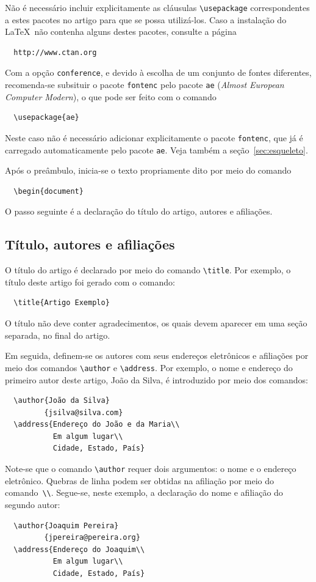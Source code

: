 \documentclass[conference,harvard,brazil,english]{sbatex}
\begin{document}
Não é necessário incluir explicitamente as cláusulas
\verb+\usepackage+ correspondentes a estes pacotes no artigo para que
se possa utilizá-los. Caso a instalação do \LaTeX\ não contenha alguns
destes pacotes, consulte a página
\begin{verbatim}
  http://www.ctan.org
\end{verbatim}



Com a opção \verb+conference+, e devido à escolha de um conjunto de
fontes diferentes, recomenda-se subsituir o pacote \verb+fontenc+ pelo
pacote \verb+ae+ (\emph{Almost European Computer Modern}), o que pode
ser feito com o comando
\begin{verbatim}
  \usepackage{ae}
\end{verbatim}
Neste caso não é necessário adicionar explicitamente o pacote
\verb+fontenc+, que já é carregado automaticamente pelo pacote
\verb+ae+. Veja também a seção~\ref{sec:esqueleto}.

Após o preâmbulo, inicia-se o texto propriamente dito por meio do
comando
\begin{verbatim}
  \begin{document}
\end{verbatim}
O passo seguinte é a declaração do título do artigo, autores e
afiliações.

\subsection{Título, autores e afiliações}

O título do artigo é declarado por meio do comando \verb+\title+. Por
exemplo, o título deste artigo foi gerado com o comando:
\begin{verbatim}
  \title{Artigo Exemplo}
\end{verbatim}
O título não deve conter agradecimentos, os quais devem aparecer em
uma seção separada, no final do artigo.

Em seguida, definem-se os autores com seus endereços eletrônicos e
afiliações por meio dos comandos \verb+\author+ e
\verb+\address+. Por exemplo, o nome e endereço do primeiro autor
deste artigo, João da Silva, é introduzido por meio dos comandos:
\begin{verbatim}
  \author{João da Silva}
         {jsilva@silva.com}
  \address{Endereço do João e da Maria\\
           Em algum lugar\\
           Cidade, Estado, País}
\end{verbatim}
Note-se que o comando \verb+\author+ requer dois argumentos: o nome e
o endereço eletrônico. Quebras de linha podem ser obtidas na afiliação
por meio do comando~\verb+\\+. Segue-se, neste exemplo, a declaração
do nome e afiliação do segundo autor:
\begin{verbatim}
  \author{Joaquim Pereira}
         {jpereira@pereira.org}
  \address{Endereço do Joaquim\\
           Em algum lugar\\
           Cidade, Estado, País}
\end{verbatim}
\end{document}
